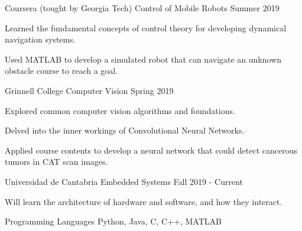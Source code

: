 \documentclass[12pt, a4paper]{awesome-cv}
\begin{document}
\begin{cventries}

    \cventry
	{Coursera (tought by Georgia Tech)}
	{Control of Mobile Robots}
	{}
	{Summer 2019}
	{
	  \begin{cvitems}
		\item{Learned the fundamental concepts of control theory for developing dynamical navigation systems.}
		\item{Used MATLAB to develop a simulated robot that can navigate an unknown obstacle course to reach a goal.}
	  \end{cvitems}
	}

    \cventry
	{Grinnell College}
	{Computer Vision}
	{}
	{Spring 2019}
	{
	  \begin{cvitems}
		\item{Explored common computer vision algorithms and foundations.}
		\item{Delved into the inner workings of Convolutional Neural Networks.}
		\item{Applied course contents to develop a neural network that could detect cancerous tumors in CAT scan images.}
	  \end{cvitems}
	}

    \cventry
	{Universidad de Cantabria}
	{Embedded Systems}
	{}
	{Fall 2019 - Current}
	{
	  \begin{cvitems}
		\item{Will learn the architecture of hardware and software, and how they interact.}
	  \end{cvitems}
	}

\end{cventries}

\begin{cvskills}
  \cvskill
    {Programming Languages} 
    {Python, Java, C, C++, MATLAB} 

\end{cvskills}
\end{document}
